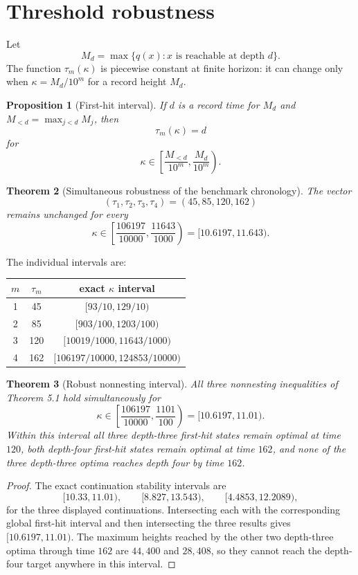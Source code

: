 \documentclass[11pt]{amsart}
\newtheorem{theorem}{Theorem}[section]
\newtheorem{proposition}[theorem]{Proposition}
\theoremstyle{definition}
\begin{document}
\section{Threshold robustness}

Let
\[
M_d=\max\{q(x):x\text{ is reachable at depth }d\}.
\]
The function $\tau_m(\kappa)$ is piecewise constant at finite horizon: it can change only when $\kappa=M_d/10^m$ for a record height $M_d$.

\begin{proposition}[First-hit interval]
If $d$ is a record time for $M_d$ and $M_{<d}=\max_{j<d}M_j$, then
\[
\tau_m(\kappa)=d
\]
for
\[
\kappa\in\left[\frac{M_{<d}}{10^m},\frac{M_d}{10^m}\right).
\]
\end{proposition}

\begin{theorem}[Simultaneous robustness of the benchmark chronology]
The vector
\[
(\tau_1,\tau_2,\tau_3,\tau_4)=(45,85,120,162)
\]
remains unchanged for every
\[
\boxed{
\kappa\in\left[\frac{106197}{10000},\frac{11643}{1000}\right)
=[10.6197,11.643).
}
\]
\end{theorem}

The individual intervals are:
\begin{center}
\begin{tabular}{ccc}
\toprule
$m$&$\tau_m$&exact $\kappa$ interval\\
\midrule
1&45&$[93/10,129/10)$\\
2&85&$[903/100,1203/100)$\\
3&120&$[10019/1000,11643/1000)$\\
4&162&$[106197/10000,124853/10000)$\\
\bottomrule
\end{tabular}
\end{center}

\begin{theorem}[Robust nonnesting interval]
All three nonnesting inequalities of Theorem 5.1 hold simultaneously for
\[
\boxed{
\kappa\in\left[\frac{106197}{10000},\frac{1101}{100}\right)
=[10.6197,11.01).
}
\]
Within this interval all three depth-three first-hit states remain optimal at time $120$, both depth-four first-hit states remain optimal at time $162$, and none of the three depth-three optima reaches depth four by time $162$.
\end{theorem}

\begin{proof}
The exact continuation stability intervals are
\[
[10.33,11.01),\qquad[8.827,13.543),\qquad[4.4853,12.2089),
\]
for the three displayed continuations.  Intersecting each with the corresponding global first-hit interval and then intersecting the three results gives $[10.6197,11.01)$.  The maximum heights reached by the other two depth-three optima through time $162$ are $44{,}400$ and $28{,}408$, so they cannot reach the depth-four target anywhere in this interval.
\end{proof}
\end{document}
